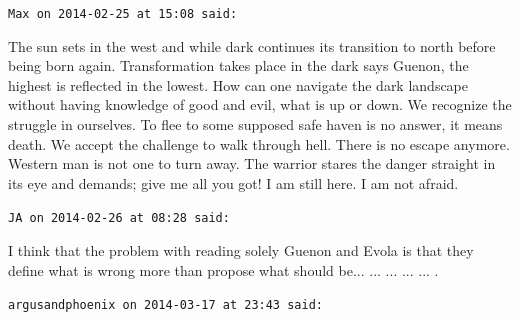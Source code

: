 \begin{footnotesize}
\begin{sffamily}
\hfill

\texttt{Max on 2014-02-25 at 15:08 said:}

The sun sets in the west and while dark continues its transition to north before being born again. Transformation takes place in the dark says Guenon, the highest is reflected in the lowest. How can one navigate the dark landscape without having knowledge of good and evil, what is up or down. We recognize the struggle in ourselves. To flee to some supposed safe haven is no answer, it means death. We accept the challenge to walk through hell. There is no escape anymore. Western man is not one to turn away. The warrior stares the danger straight in its eye and demands; give me all you got! I am still here. I am not afraid.

\hfill

\texttt{JA on 2014-02-26 at 08:28 said:}

I think that the problem with reading solely Guenon and Evola is that they define what is wrong more than propose what should be... ... ... ... ... .

\hfill

\texttt{argusandphoenix on 2014-03-17 at 23:43 said:}


\end{sffamily}
\end{footnotesize}
